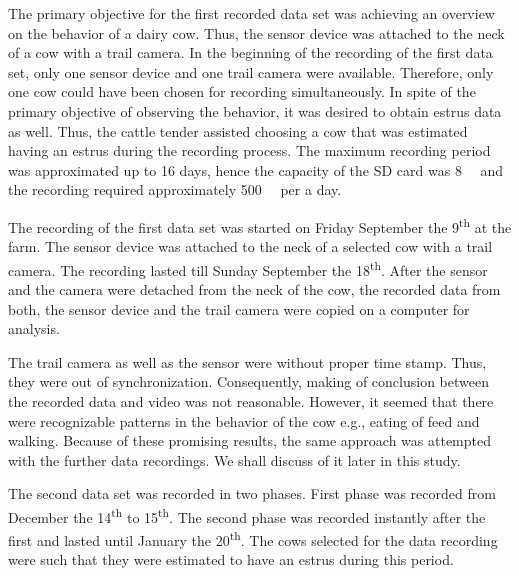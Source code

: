 \documentclass[english,12pt,a4paper,pdftex,elec,utf8]{aaltothesis}
\begin{document}




The primary objective for the first recorded data set was achieving an overview on the behavior of a dairy cow. Thus, the sensor device was attached to the neck of a cow with a trail camera. In the beginning of the recording of the first data set, only one sensor device and one trail camera were available. Therefore, only one cow could have been chosen for recording simultaneously. In spite of the primary objective of observing the behavior, it was desired to obtain estrus data as well. Thus, the cattle tender assisted choosing a cow that was estimated having an estrus during the recording process. The maximum recording period was approximated up to 16 days, hence the capacity of the SD card was \SI{8}{\giga \byte} and the recording required approximately \SI{500}{\mega \byte} per a day.

The recording of the first data set was started on Friday September the 9\textsuperscript{th} at the farm. The sensor device was attached to the neck of a selected cow with a trail camera. The recording lasted till Sunday September the 18\textsuperscript{th}. After the sensor and the camera were detached from the neck of the cow, the recorded data from both, the sensor device and the trail camera were copied on a computer for analysis.

The trail camera as well as the sensor were without proper time stamp. Thus, they were out of synchronization. Consequently, making of conclusion between the recorded data and video was not reasonable. However, it seemed that there were recognizable patterns in the behavior of the cow e.g., eating of feed and walking. Because of these promising results, the same approach was attempted with the further data recordings. We shall discuss of it later in this study.



The second data set was recorded in two phases. First phase was recorded from December the 14\textsuperscript{th} to 15\textsuperscript{th}. The second phase was recorded instantly after the first and lasted until January the 20\textsuperscript{th}. The cows selected for the data recording were such that they were estimated to have an estrus during this period.
\end{document}
